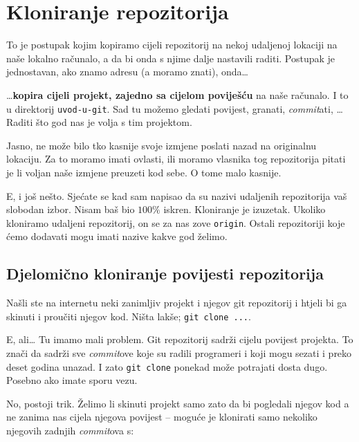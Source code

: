 \section*{Kloniranje repozitorija}

To je postupak kojim kopiramo cijeli repozitorij na nekoj udaljenoj lokaciji na naše lokalno računalo, a da bi onda s njime dalje nastavili raditi.
Postupak je jednostavan, ako znamo adresu (a moramo znati), onda\dots



\dots{}\textbf{kopira cijeli projekt, zajedno sa cijelom poviješću} na naše računalo.
I to u direktorij \verb+uvod-u-git+.
Sad tu možemo gledati povijest, granati, \emph{commit}ati, \dots Raditi što god nas je volja s tim projektom.

Jasno, ne može bilo tko kasnije svoje izmjene poslati nazad na originalnu lokaciju. 
Za to moramo imati ovlasti, ili moramo vlasnika tog repozitorija pitati je li voljan naše izmjene preuzeti kod sebe.
O tome malo kasnije.

E, i još nešto. Sjećate se kad sam napisao da su nazivi udaljenih repozitorija vaš slobodan izbor.
Nisam baš bio $100\%$ iskren. 
Kloniranje je izuzetak.
Ukoliko kloniramo udaljeni repozitorij, on se za nas zove \verb+origin+.
Ostali repozitoriji koje ćemo dodavati mogu imati nazive kakve god želimo.

\subsection*{Djelomično kloniranje povijesti repozitorija}

Našli ste na internetu neki zanimljiv projekt i njegov git repozitorij i htjeli bi ga skinuti i proučiti njegov kod. 
Ništa lakše; \verb+git clone ...+.

E, ali\dots
Tu imamo mali problem.
Git repozitorij sadrži cijelu povijest projekta. 
To znači da sadrži sve \emph{commit}ove koje su radili programeri i koji mogu sezati i preko deset godina unazad.
I zato \verb+git clone+ ponekad može potrajati dosta dugo. 
Posebno ako imate sporu vezu.

No, postoji trik.
Želimo li skinuti projekt samo zato da bi pogledali njegov kod a ne zanima nas cijela njegova povijest -- moguće je klonirati samo nekoliko njegovih zadnjih \emph{commit}ova s:

